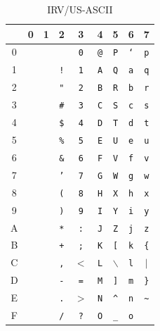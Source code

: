 \documentclass[a4j,10pt,fleqn]{jsarticle}
\begin{document}
\begin{table}[htp]
\begin{center}\begin{tabular}{|c||c|c|c|c|c|c|c|c|}
    \hline
       & 0 & 1  & 2          & 3          & 4             & 5          & 6             & 7 \\ \hline \hline
    0  & ~ & ~  &            & \texttt{0} & \texttt{@}    & \texttt{P} & \texttt{`}    & \texttt{p} \\ \hline
    1  & ~ & ~  & \texttt{!} & \texttt{1} & \texttt{A}    & \texttt{Q} & \texttt{a}    & \texttt{q} \\ \hline
    2  & ~ & ~  & \texttt{"} & \texttt{2} & \texttt{B}    & \texttt{R} & \texttt{b}    & \texttt{r} \\ \hline
    3  & ~ & ~ & \texttt{\#} & \texttt{3} & \texttt{C}    & \texttt{S} & \texttt{c}    & \texttt{s} \\ \hline
    4  & ~ & ~ & \texttt{\$} & \texttt{4} & \texttt{D}    & \texttt{T} & \texttt{d}    & \texttt{t} \\ \hline
    5  & ~ & ~ & \texttt{\%} & \texttt{5} & \texttt{E}    & \texttt{U} & \texttt{e}    & \texttt{u} \\ \hline
    6  & ~ & ~ & \texttt{\&} & \texttt{6} & \texttt{F}    & \texttt{V} & \texttt{f}    & \texttt{v} \\ \hline
    7  & ~ & ~  & \texttt{'} & \texttt{7} & \texttt{G}    & \texttt{W} & \texttt{g}    & \texttt{w} \\ \hline
    8  & ~ & ~  & \texttt{(} & \texttt{8} & \texttt{H}    & \texttt{X} & \texttt{h}    & \texttt{x} \\ \hline
    9  & ~ & ~  & \texttt{)} & \texttt{9} & \texttt{I}    & \texttt{Y} & \texttt{i}    & \texttt{y} \\ \hline
    A  & ~ & ~  & \texttt{*} & \texttt{:} & \texttt{J}    & \texttt{Z} & \texttt{j}    & \texttt{z} \\ \hline
    B  & ~ & ~  & \texttt{+} & \texttt{;} & \texttt{K}    & \texttt{[} & \texttt{k}   & \texttt{\{} \\ \hline
    C  & ~ & ~  & \texttt{,}        & $<$ & \texttt{L}  & $\backslash$ & \texttt{l}         &   $|$ \\ \hline
    D  & ~ & ~  & \texttt{-} & \texttt{=} & \texttt{M}    & \texttt{]} & \texttt{m}   & \texttt{\}} \\ \hline
    E  & ~ & ~  & \texttt{.}        & $>$ & \texttt{N} & \texttt{\^{}} & \texttt{n} & \texttt{\~{}} \\ \hline
    F  & ~ & ~  & \texttt{/} & \texttt{?} & \texttt{O}   & \texttt{\_} & \texttt{o}             &   \\ \hline
\end{tabular}\end{center}
\caption{IRV/US-ASCII} \label{tbl:US-ASCII}
\end{table}
\end{document}
